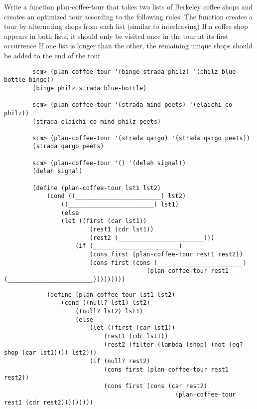 \begin{blocksection}
    \question Write a function plan-coffee-tour that takes two lists of Berkeley coffee shops and creates 
    an optimized tour according to the following rules:
    The function creates a tour by alternating shops from each list (similar to interleaving)
    If a coffee shop appears in both lists, it should only be visited once in the tour at its first occurrence
    If one list is longer than the other, the remaining unique shops should be added to the end of the tour
    
    \begin{lstlisting}
        scm> (plan-coffee-tour '(binge strada philz) '(philz blue-bottle binge))
        (binge philz strada blue-bottle)
        
        scm> (plan-coffee-tour '(strada mind peets) '(elaichi-co philz))
        (strada elaichi-co mind philz peets)
        
        scm> (plan-coffee-tour '(strada qargo) '(strada qargo peets))
        (strada qargo peets)
        
        scm> (plan-coffee-tour '() '(delah signal))
        (delah signal)

        (define (plan-coffee-tour lst1 lst2)
            (cond ((________________________) lst2)
                ((________________________) lst1)
                (else
                (let ((first (car lst1))
                        (rest1 (cdr lst1))
                        (rest2 (________________________)))
                    (if (________________________)
                        (cons first (plan-coffee-tour rest1 rest2))
                        (cons first (cons (________________________)
                                        (plan-coffee-tour rest1 (________________________)))))))))
    \end{lstlisting}

    \begin{solution}[1in]
        \begin{lstlisting}
            (define (plan-coffee-tour lst1 lst2)
                (cond ((null? lst1) lst2)
                    ((null? lst2) lst1)
                    (else
                        (let ((first (car lst1))
                            (rest1 (cdr lst1))
                            (rest2 (filter (lambda (shop) (not (eq? shop (car lst1)))) lst2)))
                        (if (null? rest2)
                            (cons first (plan-coffee-tour rest1 rest2))
                            (cons first (cons (car rest2)
                                                (plan-coffee-tour rest1 (cdr rest2)))))))))

        \end{lstlisting}
    \end{solution}
    
\end{blocksection}